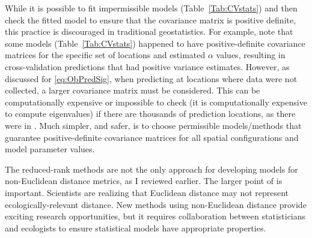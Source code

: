 While it is possible to fit impermissible models (Table~\ref{Tab:CVstats}) and then check the fitted model to ensure that the covariance matrix is positive definite, this practice is discouraged in traditional geostatistics. For example, note that some models (Table~\ref{Tab:CVstats}) happened to have positive-definite covariance matrices for the specific set of locations and estimated $\alpha$ values, resulting in cross-validation predictions that had positive variance estimates.  However, as discussed for \ref{eq:ObPredSig}, when predicting at locations where data were not collected, a larger covariance matrix must be considered. This can be computationally expensive or impossible to check (it is computationally expensive to compute eigenvalues) if there are thousands of prediction locations, as there were in \citet{Ladl:Avga:Whea:Boyc:pred:2016}. Much simpler, and safer, is to choose permissible models/methods that guarantee positive-definite covariance matrices for all spatial configurations and model parameter values. 

The reduced-rank methods are not the only approach for developing models for non-Euclidean distance metrics, as I reviewed earlier. The larger point of \citet{Ladl:Avga:Whea:Boyc:pred:2016} is important. Scientists are realizing that Euclidean distance may not represent ecologically-relevant distance.  New methods using non-Euclidean distance provide exciting research opportunities, but it requires collaboration between statisticians and ecologists to ensure statistical models have appropriate properties. 

